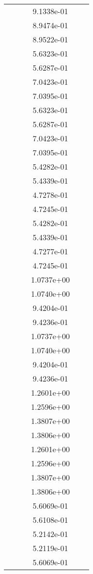\begin{xltabular}{\textwidth}{r|rS[table-format=1.3e+2]S[table-format=1.4e+2]S[table-format=1.4e+2]S[table-format=-1.5]}
&  &  & 9.1338e-01 & & \\
&  &  & 8.9474e-01 & & \\
&  &  & 8.9522e-01 & & \\
&  &  & 5.6323e-01 & & \\
&  &  & 5.6287e-01 & & \\
&  &  & 7.0423e-01 & & \\
&  &  & 7.0395e-01 & & \\
&  &  & 5.6323e-01 & & \\
&  &  & 5.6287e-01 & & \\
&  &  & 7.0423e-01 & & \\
&  &  & 7.0395e-01 & & \\
&  &  & 5.4282e-01 & & \\
&  &  & 5.4339e-01 & & \\
&  &  & 4.7278e-01 & & \\
&  &  & 4.7245e-01 & & \\
&  &  & 5.4282e-01 & & \\
&  &  & 5.4339e-01 & & \\
&  &  & 4.7277e-01 & & \\
&  &  & 4.7245e-01 & & \\
&  &  & 1.0737e+00 & & \\
&  &  & 1.0740e+00 & & \\
&  &  & 9.4204e-01 & & \\
&  &  & 9.4236e-01 & & \\
&  &  & 1.0737e+00 & & \\
&  &  & 1.0740e+00 & & \\
&  &  & 9.4204e-01 & & \\
&  &  & 9.4236e-01 & & \\
&  &  & 1.2601e+00 & & \\
&  &  & 1.2596e+00 & & \\
&  &  & 1.3807e+00 & & \\
&  &  & 1.3806e+00 & & \\
&  &  & 1.2601e+00 & & \\
&  &  & 1.2596e+00 & & \\
&  &  & 1.3807e+00 & & \\
&  &  & 1.3806e+00 & & \\
&  &  & 5.6069e-01 & & \\
&  &  & 5.6108e-01 & & \\
&  &  & 5.2142e-01 & & \\
&  &  & 5.2119e-01 & & \\
&  &  & 5.6069e-01 & & \\

\end{xltabular}
